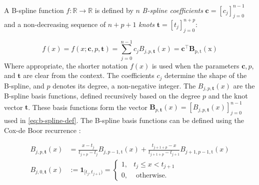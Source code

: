 A B-spline function $f: \mathbb{R} \rightarrow \mathbb{R}$ is defined by $n$ \emph{B-spline coefficients} $\mathbf{c} = [c_j]_{j=0}^{n-1}$ and a non-decreasing sequence of $n+p+1$ \emph{knots} $\mathbf{t} = [t_j]_{j=0}^{n+p}$:

\begin{equation}\label{eq:b-spline-def}
    f(x) = f(x ; \mathbf{c}, p, \mathbf{t})=\sum_{j=0}^{n-1} c_j B_{j, p, \mathbf{t}}(x)=\mathbf{c}^{\top} \mathbf{B}_{\mathrm{p}, \mathrm{t}}(\mathrm{x})
\end{equation}
Where appropriate, the shorter notation $f(x)$ is used when the parameters $\mathbf{c}, p$, and $\mathbf{t}$ are clear from the context. The coefficients $c_j$ determine the shape of the B-spline, and $p$ denotes its degree, a non-negative integer. The $B_{j, p, \mathbf{t}}(x)$ are the B-spline basis functions, defined recursively based on the degree $p$ and the knot vector $\mathbf{t}$. These basis functions form the vector $\mathbf{B}_{p, \mathbf{t}}(x) = [B_{j, p, \mathbf{t}}(x)]_{j=0}^{n-1}$ used in \cref{eq:b-spline-def}. The B-spline basis functions can be defined using the Cox-de Boor recurrence \citep{deBoor1978practicalguide}:

\begin{subequations}\label{eq:b-spline-recurrence}
    \begin{align}
        B_{j, p, \mathbf{t}}(x) & =\frac{x-t_j}{t_{j+p}-t_j} B_{j, p-1, \mathrm{t}}(x)+\frac{t_{j+1+p}-x}{t_{j+1+p}-t_{j+1}} B_{j+1, p-1, \mathrm{t}}(x) \label{eq:b-spline-recurrence-p} \\
        B_{j, 0, \mathbf{t}}(x) & := 
        \mathbf 1_{[t_j, t_{j+1})} =
        \begin{cases}
            1, & t_j \leq x<t_{j+1} \\
            0, & \text { otherwise. }
        \end{cases} \label{eq:b-spline-recurrence-0}
    \end{align}
\end{subequations}


